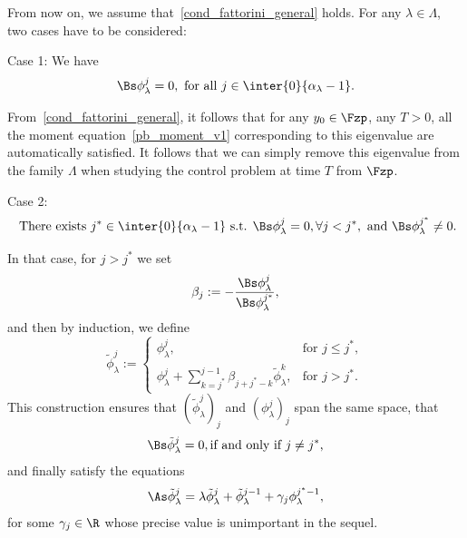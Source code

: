 From now on, we assume that~\eqref{cond_fattorini_general} holds. For any $\lambda\in \Lambda$, two cases have to be considered:
\begin{step}{Case 1:}
We have
\begin{equation*}\label{AC_case1}
\Bs \phi_\lambda^j=0, \ \text{for all }j\in \inter{0}{\alpha_\lambda-1}.
\end{equation*}

From~\eqref{cond_fattorini_general}, it follows that for any $y_0\in \Fzp$, any $T>0$, all the moment equation~\eqref{pb_moment_v1} corresponding to this eigenvalue are automatically satisfied. It follows that we can simply remove this eigenvalue from the family $\Lambda$ when studying the control problem at time $T$ from $\Fzp$.
\end{step}
\begin{step}{Case 2:}
\begin{equation}\label{AC_case2}
\text{ There exists } j^*\in \inter{0}{\alpha_\lambda-1} \text{ s.t. } \Bs \phi_\lambda^j=0, \forall j< j^*, \ \text{and} \ \Bs \phi_\lambda^{j^*}\neq 0.
\end{equation}

In that case, for $j>j^*$ we set
\[
\beta_j:=-\frac{\Bs \phi_\lambda^j}{\Bs \phi_\lambda^{j^*}},
\]
and then by induction, we define
\begin{equation}\label{def_phi_tilde}
\tilde{\phi}_\lambda^j :=
\begin{cases} \phi_\lambda^j,& \text{for }j\leq j^*,\\
\displaystyle \phi_\lambda^j + \sum_{k=j^*}^{j-1} \beta_{j+j^*-k} \tilde{\phi}_\lambda^k,& \text{for }j>j^*.
\end{cases}
\end{equation}
This construction ensures that $(\tilde{\phi}_\lambda^j)_j$ and $(\phi_\lambda^j)_j$ span the same space, that
\begin{equation}\label{observabilite_generale}
\Bs \tilde{\phi}_\lambda^j=0, \text{if and only if $j\neq j^*$,}
\end{equation}
and finally satisfy the equations
\[
\As \tilde{\phi}_\lambda^j = \lambda \tilde{\phi}_\lambda^j + \tilde{\phi}_\lambda^{j-1} + \gamma_j \phi_\lambda ^{j^*-1},
\]
for some $\gamma_j\in \R$ whose precise value is unimportant in the sequel.


\end{step}
